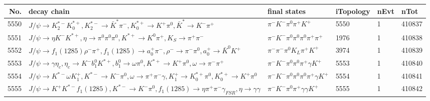 \begin{table}[htbp] 
\begin{center}
\begin{small}
\begin{tabular}{rlllll}\hline\hline
 No. & decay chain & final states &  iTopology & nEvt & nTot \\\hline
5550&$J/\psi       \rightarrow K_2^{*-}       K_{0}^{*+}     , K_2^{*-}        \rightarrow \bar{K}^{*}   \pi^{-}        , K_{0}^{*+}      \rightarrow K^{+}          \pi^{0}        , \bar{K}^{*}    \rightarrow K^{-}          \pi^{+}        $&$\pi^{-}        K^{-}          \pi^{0}        \pi^{+}        K^{+}          $& 5550&    1&410837\\
5551&$J/\psi       \rightarrow \eta          K^{-}          K^{*+}         , \eta           \rightarrow \pi^{0}        \pi^{0}        \pi^{0}        , K^{*+}          \rightarrow K^{0}          \pi^{+}        , K_{S}           \rightarrow \pi^{+}        \pi^{-}        $&$\pi^{-}        K^{-}          \pi^{0}        \pi^{0}        \pi^{0}        \pi^{+}        \pi^{+}        $& 1976&    1&410838\\
5552&$J/\psi       \rightarrow f_{1}(1285)    \rho^{-}      \pi^{+}        , f_{1}(1285)     \rightarrow a_{0}^{+}      \pi^{-}        , \rho^{-}       \rightarrow \pi^{-}        \pi^{0}        , a_{0}^{+}       \rightarrow \bar{K}^{0}   K^{+}          $&$\pi^{-}        \pi^{-}        \pi^{0}        K_{L}          \pi^{+}        K^{+}          $& 3974&    1&410839\\
5553&$J/\psi       \rightarrow \gamma       \eta_{c}    , \eta_{c}     \rightarrow K^{-}          b_{1}^{0}      K^{*+}         , b_{1}^{0}       \rightarrow \omega         \pi^{0}        , K^{*+}          \rightarrow K^{+}          \pi^{0}        , \omega          \rightarrow \pi^{-}        \pi^{+}        $&$\pi^{-}        K^{-}          \pi^{0}        \pi^{0}        \pi^{+}        \gamma       K^{+}          $& 5553&    1&410840\\
5554&$J/\psi       \rightarrow K^{*-}         \omega         K_1^{+}        , K^{*-}          \rightarrow K^{-}          \pi^{0}        , \omega          \rightarrow \pi^{+}        \pi^{-}        \gamma       , K_1^{+}         \rightarrow K_{0}^{*+}     \pi^{0}        , K_{0}^{*+}      \rightarrow K^{+}          \pi^{0}        $&$\pi^{-}        K^{-}          \pi^{0}        \pi^{0}        \pi^{0}        \pi^{+}        \gamma       K^{+}          $& 5554&    1&410841\\
5555&$J/\psi       \rightarrow K^{+}          K^{*-}         f_{1}(1285)    , K^{*-}          \rightarrow K^{-}          \pi^{0}        , f_{1}(1285)     \rightarrow \eta          \pi^{+}        \pi^{-}        \gamma_{FSR} , \eta           \rightarrow \gamma       \gamma       $&$\pi^{-}        K^{-}          \pi^{0}        \pi^{+}        \gamma       \gamma       K^{+}          $& 5555&    1&410842\\

\end{tabular}
\end{small}
\end{center}
\end{table}
